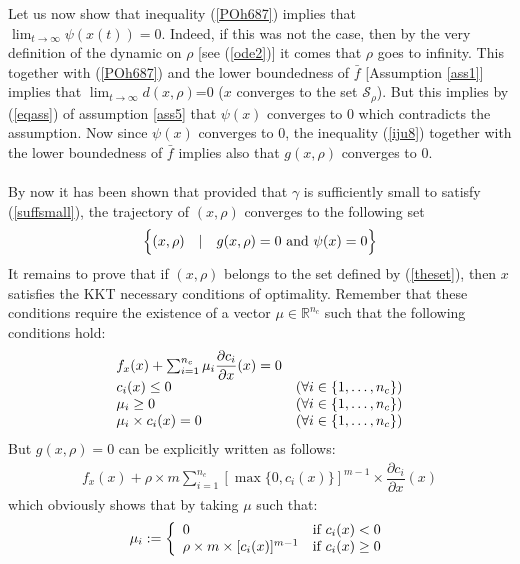 \documentclass{article}
\begin{document}
Let us now show that inequality  (\ref{POh687}) implies that $\lim_{t\rightarrow \infty}\psi(x(t))=0$. Indeed, if this was not the case, then by the very definition of the dynamic on $\rho$ [see (\ref{ode2})] it comes that $\rho$ goes to infinity. This together with (\ref{POh687}) and the lower boundedness of $\bar f$ [Assumption \ref{ass1}] implies that $\lim_{t\rightarrow \infty} d(x,\rho)$=0 ($x$ converges to the set $\mathcal S_\rho$). But this implies by (\ref{eqass}) of assumption \ref{ass5} that $\psi(x)$ converges to $0$ which  contradicts the assumption. Now since $\psi(x)$ converges to $0$, the inequality (\ref{iju8}) together with the lower boundedness of $\bar f$ implies also that $g(x,\rho)$ converges to $0$.\ \\ \ \\ 
By now it has  been shown that provided that $\gamma$ is sufficiently small to satisfy (\ref{suffsmall}), the trajectory of $(x,\rho)$ converges to the following set
\begin{eqnarray}
\Bigl\{(x,\rho)\quad \vert\quad g(x,\rho)=0 \ \mbox{\rm and} \ \psi(x)=0\Bigr\} \label{theset} 
\end{eqnarray} 
It remains to prove that if $(x,\rho)$ belongs to the set defined by (\ref{theset}), then $x$ satisfies the KKT necessary conditions of optimality. Remember that these conditions require the existence of a vector $\mu\in \mathbb{R}^{n_c}$ such that the following conditions hold:
\begin{eqnarray}
\begin{array}{ll}
f_x(x)+\sum_{i=1}^{n_c}\mu_i\dfrac{\partial c_i}{\partial x}(x)=0 \cr
c_i(x)\le 0 &(\forall i\in \{1,\dots,n_c\})\cr 
\mu_i\ge 0 &(\forall i\in \{1,\dots,n_c\})\cr
\mu_i\times c_i(x)=0&(\forall i\in \{1,\dots,n_c\})
\end{array} 
\end{eqnarray} 
But $g(x,\rho)=0$ can be explicitly written as follows:
\begin{eqnarray}
f_x(x)+\rho\times m\sum_{i=1}^{n_c}\left[\max\{0,c_i(x)\}\right]^{m-1}\times \dfrac{\partial c_i}{\partial x}(x)
\end{eqnarray} 
which obviously shows that by taking $\mu$ such that:
\begin{eqnarray}
\mu_i:= \left\{ 
\begin{array}{ll}
 0& \mbox{\rm if $c_i(x)<0$}\\
 \rho\times m\times [c_i(x)]^{m-1}& \mbox{if $c_i(x)\ge 0$}
\end{array}
\right. \label{tgt543210} 
\end{eqnarray} 
\end{document}
